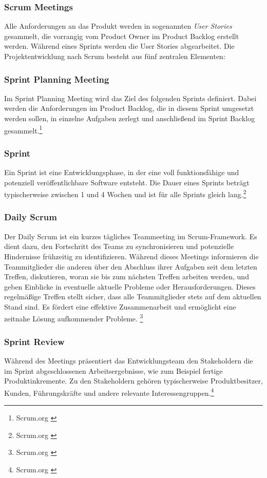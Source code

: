 \subsubsection{Scrum Meetings}
Alle Anforderungen an das Produkt werden in sogenannten \textit{User Stories} gesammelt, die vorrangig vom Product Owner
im Product Backlog erstellt werden. Während eines Sprints werden die User Stories abgearbeitet. Die Projektentwicklung
nach Scrum besteht aus fünf zentralen Elementen:

\subsubsection*{Sprint Planning Meeting}
Im Sprint Planning Meeting wird das Ziel des folgenden Sprints definiert. Dabei werden die Anforderungen im Product
Backlog, die in diesem Sprint umgesetzt werden sollen, in einzelne Aufgaben zerlegt und anschließend im Sprint Backlog
gesammelt.\footnote{Scrum.org \cite{What is Sprint Planning}}

\subsubsection*{Sprint}
Ein Sprint ist eine Entwicklungsphase, in der eine voll funktionsfähige und potenziell veröffentlichbare Software
entsteht. Die Dauer eines Sprints beträgt typischerweise zwischen 1 und 4 Wochen und ist für alle Sprints gleich lang.\footnote{Scrum.org \cite{What is a Sprint}}

\subsubsection*{Daily Scrum}
Der Daily Scrum ist ein kurzes tägliches Teammeeting im Scrum-Framework. Es dient dazu, den Fortschritt des Teams zu
synchronisieren und potenzielle Hindernisse frühzeitig zu identifizieren. Während dieses Meetings informieren die
Teammitglieder die anderen über den Abschluss ihrer Aufgaben seit dem letzten Treffen, diskutieren, woran sie bis zum
nächsten Treffen arbeiten werden, und geben Einblicke in eventuelle aktuelle Probleme oder Herausforderungen. Dieses
regelmäßige Treffen stellt sicher, dass alle Teammitglieder stets auf dem aktuellen Stand sind. Es fördert eine effektive
Zusammenarbeit und ermöglicht eine zeitnahe Lösung aufkommender Probleme. \footnote{Scrum.org \cite{What is a Daily Scrum}}

\subsubsection*{Sprint Review}
Während des Meetings präsentiert das Entwicklungsteam den Stakeholdern die im Sprint abgeschlossenen Arbeitsergebnisse,
wie zum Beispiel fertige Produktinkremente. Zu den Stakeholdern gehören typischerweise Produktbesitzer, Kunden,
Führungskräfte und andere relevante Interessengruppen.\footnote{Scrum.org \cite{What is a Sprint Review}}

